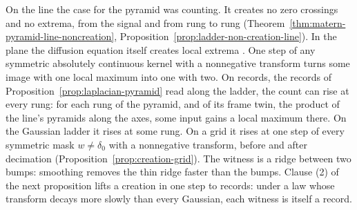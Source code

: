 On the line the case for the \Matern{} pyramid was counting. It creates no zero crossings and no
extrema, from the signal and from rung to rung (Theorem~\ref{thm:matern-pyramid-line-noncreation},
Proposition~\ref{prop:ladder-non-creation-line}). In the plane the diffusion equation itself creates
local extrema . One step of any symmetric absolutely continuous kernel
with a nonnegative transform turns some image with one local maximum into one with two. On records,
the records of Proposition~\ref{prop:laplacian-pyramid} read along the ladder, the count can rise
at every rung: for each rung of the \Matern{} pyramid, and of its frame twin, the product of the
line's \Matern{} pyramids along the axes, some input gains a local maximum there. On the Gaussian
ladder it rises at some rung. On a grid it rises at one step of every symmetric mask $w \ne
\delta_0$ with a nonnegative transform, before and after decimation
(Proposition~\ref{prop:creation-grid}). The witness is a ridge between two bumps: smoothing removes
the thin ridge faster than the bumps. Clause (2) of the next proposition lifts a creation in one
step to records: under a law whose transform decays more slowly than every Gaussian, each witness
is itself a record.


